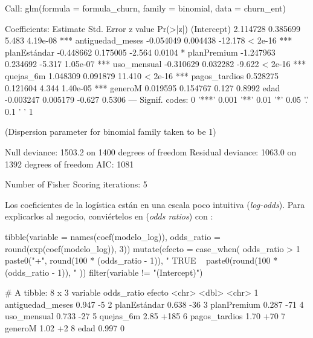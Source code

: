 \begin{rsalida}

Call:
glm(formula = formula_churn, family = binomial, data = churn_ent)

Coefficients:
                  Estimate Std. Error z value Pr(>|z|)    
(Intercept)       2.114728   0.385699   5.483 4.19e-08 ***
antiguedad_meses -0.054049   0.004438 -12.178  < 2e-16 ***
planEstándar     -0.448662   0.175005  -2.564   0.0104 *  
planPremium      -1.247963   0.234692  -5.317 1.05e-07 ***
uso_mensual      -0.310629   0.032282  -9.622  < 2e-16 ***
quejas_6m         1.048309   0.091879  11.410  < 2e-16 ***
pagos_tardios     0.528275   0.121604   4.344 1.40e-05 ***
generoM           0.019595   0.154767   0.127   0.8992    
edad             -0.003247   0.005179  -0.627   0.5306    
---
Signif. codes:  0 '***' 0.001 '**' 0.01 '*' 0.05 '.' 0.1 ' ' 1

(Dispersion parameter for binomial family taken to be 1)

    Null deviance: 1503.2  on 1400  degrees of freedom
Residual deviance: 1063.0  on 1392  degrees of freedom
AIC: 1081

Number of Fisher Scoring iterations: 5
\end{rsalida}

Los coeficientes de la logística están en una escala poco intuitiva
(\emph{log-odds}). Para explicarlos al negocio, conviértelos en
 (\emph{odds ratios}) con :

\begin{rcode}
tibble(variable   = names(coef(modelo_log)),
       odds_ratio = round(exp(coef(modelo_log)), 3)) %
  mutate(efecto = case_when(
    odds_ratio > 1 ~ paste0("+", round(100 * (odds_ratio - 1)), "%
    TRUE           ~ paste0(round(100 * (odds_ratio - 1)), "%
  )) %
  filter(variable != "(Intercept)")
\end{rcode}

\begin{rsalida}
# A tibble: 8 x 3
  variable         odds_ratio efecto      
  <chr>                 <dbl> <chr>       
1 antiguedad_meses      0.947 -5%
2 planEstándar          0.638 -36%
3 planPremium           0.287 -71%
4 uso_mensual           0.733 -27%
5 quejas_6m             2.85  +185%
6 pagos_tardios         1.70  +70%
7 generoM               1.02  +2%
8 edad                  0.997 0%
\end{rsalida}

